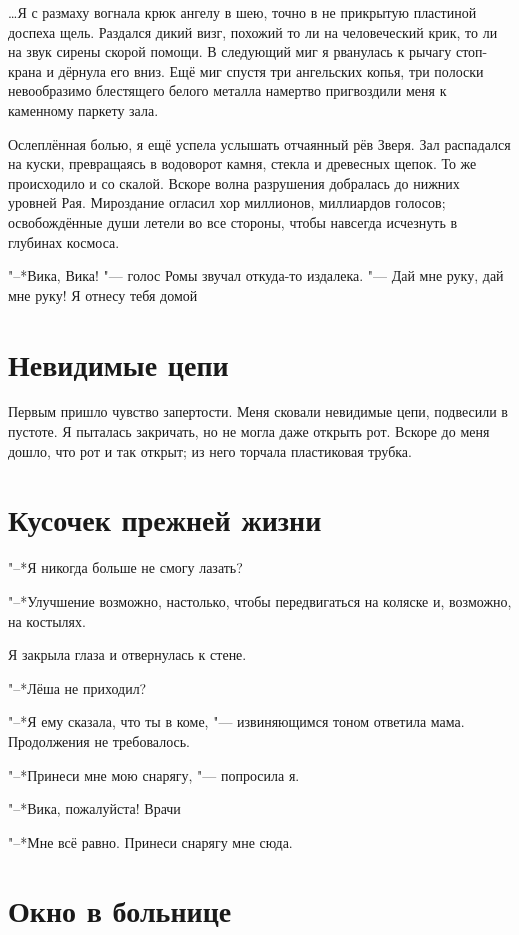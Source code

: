\dots Я с размаху вогнала крюк ангелу в шею, точно в не прикрытую пластиной доспеха щель.
Раздался дикий визг, похожий то ли на человеческий крик, то ли на звук сирены скорой помощи.
В следующий миг я рванулась к рычагу стоп-крана и дёрнула его вниз.
Ещё миг спустя три ангельских копья, три полоски невообразимо блестящего белого металла намертво пригвоздили меня к каменному паркету зала.

Ослеплённая болью, я ещё успела услышать отчаянный рёв Зверя.
Зал распадался на куски, превращаясь в водоворот камня, стекла и древесных щепок.
То же происходило и со скалой.
Вскоре волна разрушения добралась до нижних уровней Рая.
Мироздание огласил хор миллионов, миллиардов голосов;
освобождённые души летели во все стороны, чтобы навсегда исчезнуть в глубинах космоса.

"--*Вика, Вика! "--- голос Ромы звучал откуда-то издалека.
"--- Дай мне руку, дай мне руку! 
Я отнесу тебя домой\ldotst

\section{Невидимые цепи}

Первым пришло чувство запертости.
Меня сковали невидимые цепи, подвесили в пустоте.
Я пыталась закричать, но не могла даже открыть рот.
Вскоре до меня дошло, что рот и так открыт;
из него торчала пластиковая трубка.

\section{Кусочек прежней жизни}

"--*Я никогда больше не смогу лазать?

"--*Улучшение возможно, настолько, чтобы передвигаться на коляске и, возможно, на костылях.

Я закрыла глаза и отвернулась к стене.

"--*Лёша не приходил?

"--*Я ему сказала, что ты в коме, "--- извиняющимся тоном ответила мама.
Продолжения не требовалось.

"--*Принеси мне мою снарягу, "--- попросила я.

"--*Вика, пожалуйста!
Врачи\ldotst

"--*Мне всё равно.
Принеси снарягу мне сюда.

\section{Окно в больнице}

